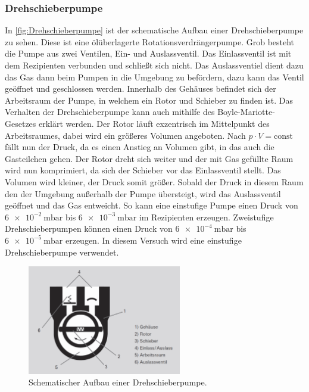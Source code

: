         \subsubsection{Drehschieberpumpe}
            In \autoref{fig:Drehschieberpumpe} ist der schematische Aufbau einer Drehschieberpumpe zu sehen.
            Diese ist eine ölüberlagerte Rotationsverdrängerpumpe.
            Grob besteht die Pumpe aus zwei Ventilen, Ein- und Auslassventil.
            Das Einlassventil ist mit dem Rezipienten verbunden und schließt sich nicht.
            Das Auslassventiel dient dazu das Gas dann beim Pumpen in die Umgebung zu befördern, dazu kann das Ventil geöffnet und geschlossen werden.
            Innerhalb des Gehäuses befindet sich der Arbeitsraum der Pumpe, in welchem ein Rotor und Schieber zu finden ist.
            Das Verhalten der Drehschieberpumpe kann auch mithilfe des Boyle-Mariotte-Gesetzes erklärt werden.
            Der Rotor läuft exzentrisch im Mittelpunkt des Arbeitsraumes, dabei wird ein größeres Volumen angeboten.
            Nach $p \cdot V = \text{const}$ fällt nun der Druck, da es einen Anstieg an Volumen gibt, in das auch die Gasteilchen gehen.
            Der Rotor dreht sich weiter und der mit Gas gefüllte Raum wird nun komprimiert, da sich der Schieber vor das Einlassventil stellt.
            Das Volumen wird kleiner, der Druck somit größer.
            Sobald der Druck in diesem Raum den der Umgebung außerhalb der Pumpe übersteigt, wird das Auslassventil geöffnet und das Gas entweicht.
            So kann eine einstufige Pumpe einen Druck von $\SI{6e-2}{\milli\bar}$ bis $\SI{6e-3}{\milli\bar}$ im Rezipienten erzeugen.
            Zweistufige Drehschieberpumpen können einen Druck von $\SI{6e-4}{\milli\bar}$ bis $\SI{6e-5}{\milli\bar}$ erzeugen.
            In diesem Versuch wird eine einstufige Drehschieberpumpe verwendet.
      
        \begin{figure}[H]
            \centering
            \includegraphics[width=0.6\textwidth]{bilder/Drehschieberpumpe.png}
            \caption{Schematischer Aufbau einer Drehschieberpumpe.\cite{Pfeiffer}}
            \label{fig:Drehschieberpumpe}
        \end{figure}

